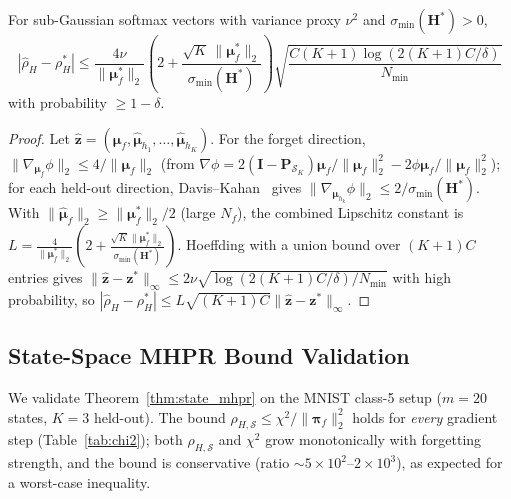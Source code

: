 \documentclass[smallextended]{svjour3}       %
\begin{document}
\begin{proposition}
\label{prop:mhpr_confidence}
For sub-Gaussian softmax vectors with variance proxy $\nu^2$ and $\sigma_{\min}(\mathbf{H}^*)>0$,
\begin{equation}
|\hat{\rho}_H - \rho_H^*| \le \frac{4\nu}{\|\boldsymbol{\mu}_f^*\|_2}\left(2+\frac{\sqrt{K}\,\|\boldsymbol{\mu}_f^*\|_2}{\sigma_{\min}(\mathbf{H}^*)}\right)\sqrt{\frac{C(K+1)\log(2(K+1)C/\delta)}{N_{\min}}}
\end{equation}
with probability $\ge 1-\delta$.
\end{proposition}
\begin{proof}
Let $\hat{\mathbf{z}}=(\hat{\boldsymbol{\mu}}_f,\hat{\boldsymbol{\mu}}_{h_1},\dots,\hat{\boldsymbol{\mu}}_{h_K})$. For the forget direction, $\|\nabla_{\boldsymbol{\mu}_f}\phi\|_2\le4/\|\boldsymbol{\mu}_f\|_2$ (from $\nabla\phi=2(\mathbf{I}-\mathbf{P}_{\mathcal{S}_K})\boldsymbol{\mu}_f/\|\boldsymbol{\mu}_f\|_2^2-2\phi\boldsymbol{\mu}_f/\|\boldsymbol{\mu}_f\|_2^2$); for each held-out direction, Davis--Kahan~\cite{stewart1990matrix} gives $\|\nabla_{\boldsymbol{\mu}_{h_k}}\phi\|_2\le2/\sigma_{\min}(\mathbf{H}^*)$. With $\|\hat{\boldsymbol{\mu}}_f\|_2\ge\|\boldsymbol{\mu}_f^*\|_2/2$ (large $N_f$), the combined Lipschitz constant is $L=\frac{4}{\|\boldsymbol{\mu}_f^*\|_2}(2+\frac{\sqrt{K}\|\boldsymbol{\mu}_f^*\|_2}{\sigma_{\min}(\mathbf{H}^*)})$. Hoeffding with a union bound over $(K+1)C$ entries gives $\|\hat{\mathbf{z}}-\mathbf{z}^*\|_\infty\le2\nu\sqrt{\log(2(K+1)C/\delta)/N_{\min}}$ with high probability, so $|\hat{\rho}_H-\rho_H^*|\le L\sqrt{(K+1)C}\|\hat{\mathbf{z}}-\mathbf{z}^*\|_\infty$.
\end{proof}

\subsection{State-Space MHPR Bound Validation}
\label{app:chi2}

We validate Theorem~\ref{thm:state_mhpr} on the MNIST class-5 setup ($m=20$ states, $K=3$ held-out). The bound $\rho_{H,\mathcal{S}} \le \chi^2/\|\boldsymbol{\pi}_f\|_2^2$ holds for \emph{every} gradient step (Table~\ref{tab:chi2}); both $\rho_{H,\mathcal{S}}$ and $\chi^2$ grow monotonically with forgetting strength, and the bound is conservative (ratio $\sim5\times10^2$--$2\times10^3$), as expected for a worst-case inequality.
\end{document}
